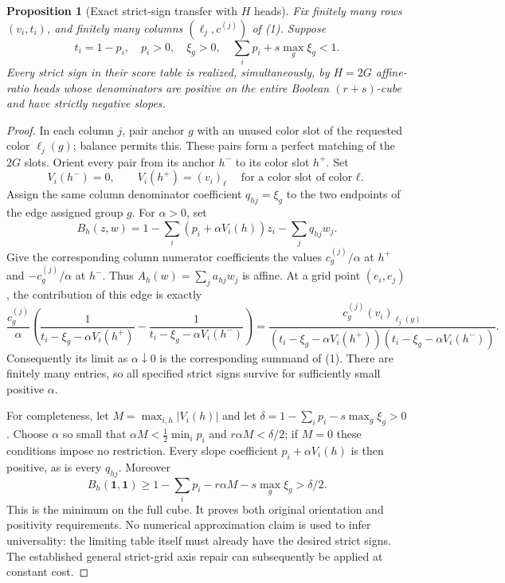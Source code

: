 \documentclass[11pt]{article}
\newtheorem{proposition}{Proposition}
\begin{document}
\begin{proposition}[Exact strict-sign transfer with $H$ heads]
Fix finitely many rows $(v_i,t_i)$, and finitely many columns
$(\ell_j,c^{(j)})$ of (1). Suppose
\[
 t_i=1-p_i,
 \quad p_i>0,
 \quad \xi_g>0,
 \quad \sum_i p_i+s\max_g\xi_g<1.                 \tag{2}
\]
Every strict sign in their score table is realized, simultaneously, by
$H=2G$ affine-ratio heads whose denominators are positive on the entire
Boolean $(r+s)$-cube and have strictly negative slopes.
\end{proposition}
\begin{proof}
In each column $j$, pair anchor $g$ with an unused color slot of the
requested color $\ell_j(g)$; balance permits this. These pairs form a
perfect matching of the $2G$ slots. Orient every pair from its anchor
$h^-$ to its color slot $h^+$. Set
\[
 V_i(h^-)=0,\qquad V_i(h^+)=(v_i)_{\ell}
 \quad\text{for a color slot of color $\ell$.}
\]
Assign the same column denominator coefficient $q_{hj}=\xi_g$ to the two
endpoints of the edge assigned group $g$. For $\alpha>0$, set
\[
 B_h(z,w)=1-\sum_i(p_i+\alpha V_i(h))z_i
                   -\sum_jq_{hj}w_j.
\]
Give the corresponding column numerator coefficients the values
$c_g^{(j)}/\alpha$ at $h^+$ and $-c_g^{(j)}/\alpha$ at $h^-$. Thus
$A_h(w)=\sum_j a_{hj}w_j$ is affine. At a grid point $(e_i,e_j)$, the
contribution of this edge is exactly
\[
 \frac{c_g^{(j)}}{\alpha}
 \left(\frac1{t_i-\xi_g-\alpha V_i(h^+)}
       -\frac1{t_i-\xi_g-\alpha V_i(h^-)}\right)
 =\frac{c_g^{(j)}(v_i)_{\ell_j(g)}}
 {(t_i-\xi_g-\alpha V_i(h^+))
  (t_i-\xi_g-\alpha V_i(h^-))}.                 \tag{3}
\]
Consequently its limit as $\alpha\downarrow0$ is the corresponding
summand of (1). There are finitely many entries, so all specified strict
signs survive for sufficiently small positive $\alpha$.

For completeness, let $M=\max_{i,h}|V_i(h)|$ and let
$\delta=1-\sum_i p_i-s\max_g\xi_g>0$. Choose $\alpha$ so small that
$\alpha M<\tfrac12\min_i p_i$ and $r\alpha M<\delta/2$; if $M=0$ these
conditions impose no restriction. Every slope coefficient
$p_i+\alpha V_i(h)$ is then positive, as is every $q_{hj}$. Moreover
\[
 B_h(\mathbf1,\mathbf1)
 \geq1-\sum_i p_i-r\alpha M-s\max_g\xi_g>\delta/2.
\]
This is the minimum on the full cube. It proves both original
orientation and positivity requirements. No numerical approximation
claim is used to infer universality: the limiting table itself must
already have the desired strict signs. The established general
strict-grid axis repair can subsequently be applied at constant cost.
\end{proof}
\end{document}
